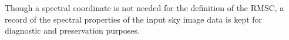 \documentclass[a4paper,10pt,bibtotoc]{scrartcl}
\begin{document}

Though a spectral coordinate is not needed for the definition of the RMSC, a record of the spectral properties of the input sky image data is kept for diagnostic and preservation purposes. 
\end{document}
